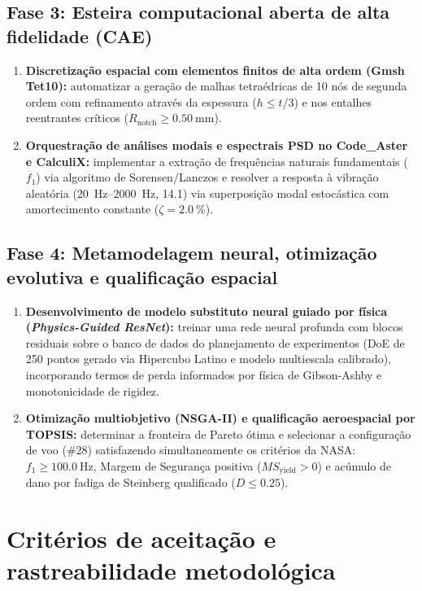 \subsection*{Fase 3: Esteira computacional aberta de alta fidelidade (CAE)}
\begin{enumerate}[resume]
  \item \textbf{Discretização espacial com elementos finitos de alta ordem (Gmsh Tet10):} automatizar a geração de malhas tetraédricas de 10 nós de segunda ordem com refinamento através da espessura ($h \le t/3$) e nos entalhes reentrantes críticos ($R_{\text{notch}} \ge \SI{0.50}{\milli\metre}$).
  \item \textbf{Orquestração de análises modais e espectrais PSD no Code\_Aster e CalculiX:} implementar a extração de frequências naturais fundamentais ($f_1$) via algoritmo de Sorensen/Lanczos e resolver a resposta à vibração aleatória (\SIrange{20}{2000}{\hertz}, \SI{14.1}{\Grms}) via superposição modal estocástica com amortecimento constante ($\zeta = \SI{2.0}{\percent}$).
\end{enumerate}

\subsection*{Fase 4: Metamodelagem neural, otimização evolutiva e qualificação espacial}
\begin{enumerate}[resume]
  \item \textbf{Desenvolvimento de modelo substituto neural guiado por física (\textit{Physics-Guided ResNet}):} treinar uma rede neural profunda com blocos residuais sobre o banco de dados do planejamento de experimentos (DoE de 250 pontos gerado via Hipercubo Latino e modelo multiescala calibrado), incorporando termos de perda informados por física de Gibson-Ashby e monotonicidade de rigidez.
  \item \textbf{Otimização multiobjetivo (NSGA-II) e qualificação aeroespacial por TOPSIS:} determinar a fronteira de Pareto ótima e selecionar a configuração de voo (\#28) satisfazendo simultaneamente os critérios da NASA: $f_1 \ge \SI{100.0}{\hertz}$, Margem de Segurança positiva ($MS_{\text{yield}} > 0$) e acúmulo de dano por fadiga de Steinberg qualificado ($D \le \num{0.25}$).
\end{enumerate}

\section{Critérios de aceitação e rastreabilidade metodológica}
\label{sec:criterios-aceitacao}

